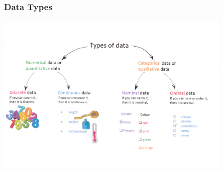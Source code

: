 \begin{frame}\frametitle{Data Types}
\centering
\includegraphics[width = 0.85\textwidth]{datatypes}
\end{frame}

